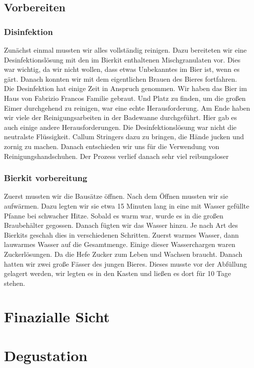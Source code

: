 \documentclass[12pt]{scrartcl}
\begin{document}
\subsection{Vorbereiten}
\subsubsection{Disinfektion}
Zunächst einmal mussten wir alles vollständig reinigen.
Dazu bereiteten wir eine Desinfektionslösung mit den im Bierkit enthaltenen Mischgranulaten vor.
Dies war wichtig, da wir nicht wollen, dass etwas Unbekanntes im Bier ist, wenn es gärt.
Danach konnten wir mit dem eigentlichen Brauen des Bieres fortfahren. \\

Die Desinfektion hat einige Zeit in Anspruch genommen. Wir haben das Bier im Haus von Fabrizio Francos Familie gebraut.
Und Platz zu finden, um die großen Eimer durchgehend zu reinigen,
war eine echte Herausforderung. Am Ende haben wir viele der Reinigungsarbeiten in der Badewanne durchgeführt.
Hier gab es auch einige andere Herausforderungen. Die Desinfektionslösung war nicht die neutralste Flüssigkeit.
Callum Stringers dazu zu bringen, die Hände jucken und zornig zu machen. Danach entschieden wir uns für die Verwendung von Reinigungshandschuhen.
Der Prozess verlief danach sehr viel reibungsloser


\subsubsection{Bierkit vorbereitung}
Zuerst mussten wir die Bausätze öffnen. Nach dem Öffnen mussten wir sie aufwärmen. Dazu legten wir
sie etwa 15 Minuten lang in eine mit Wasser gefüllte Pfanne bei schwacher Hitze. Sobald es warm war,
wurde es in die großen Braubehälter gegossen. Danach fügten wir das Wasser hinzu. Je nach Art des Bierkits
geschah dies in verschiedenen Schritten. Zuerst warmes Wasser, dann lauwarmes Wasser auf die Gesamtmenge.
Einige dieser Wasserchargen waren Zuckerlösungen. Da die Hefe Zucker zum Leben und Wachsen braucht.
Danach hatten wir zwei große Fässer des jungen Bieres.
Dieses musste vor der Abfüllung gelagert werden, wir legten es in den Kasten und ließen es dort für 10 Tage stehen.

\section{Finazialle Sicht}
\section{Degustation}
\end{document}
